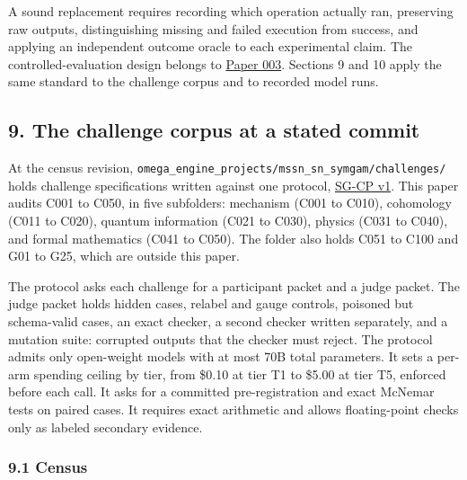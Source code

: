 \documentclass[
  11pt,
]{article}
\begin{document}
A sound replacement requires recording which operation actually ran,
preserving raw outputs, distinguishing missing and failed execution from
success, and applying an independent outcome oracle to each experimental
claim. The controlled-evaluation design belongs to
\href{https://github.com/dbccpage/the_symbol_game/blob/23893fc44162555fa12ceda3e1665982e3d7a14e/omega_engine_atlas/coda_atlas/omega_engine_symbol_game/003_pfp_host_admitted_failure_detectors/paper.md}{Paper
003}. Sections 9 and 10 apply the same standard to the challenge corpus
and to recorded model runs.

\hypertarget{the-challenge-corpus-at-a-stated-commit}{%
\subsection{9. The challenge corpus at a stated
commit}\label{the-challenge-corpus-at-a-stated-commit}}

At the census revision,
\nolinkurl{omega_engine_projects/mssn_sn_symgam/challenges/} holds
challenge specifications written against one protocol,
\href{https://github.com/dbccpage/the_symbol_game/blob/a623568eb0f853b968bc419bf06dfc6af256ab02/omega_engine_projects/mssn_sn_symgam/challenges/01_challenge_protocol.md}{SG-CP
v1}. This paper audits C001 to C050, in five subfolders: mechanism (C001
to C010), cohomology (C011 to C020), quantum information (C021 to C030),
physics (C031 to C040), and formal mathematics (C041 to C050). The
folder also holds C051 to C100 and G01 to G25, which are outside this
paper.

The protocol asks each challenge for a participant packet and a judge
packet. The judge packet holds hidden cases, relabel and gauge controls,
poisoned but schema-valid cases, an exact checker, a second checker
written separately, and a mutation suite: corrupted outputs that the
checker must reject. The protocol admits only open-weight models with at
most 70B total parameters. It sets a per-arm spending ceiling by tier,
from \$0.10 at tier T1 to \$5.00 at tier T5, enforced before each call.
It asks for a committed pre-registration and exact McNemar tests on
paired cases. It requires exact arithmetic and allows floating-point
checks only as labeled secondary evidence.

\hypertarget{census}{%
\subsubsection{9.1 Census}\label{census}}
\end{document}
